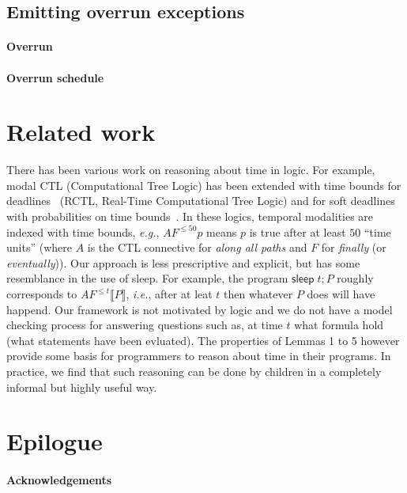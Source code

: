\documentclass[preprint]{sigplanconf}
\renewcommand{\leq}{\leqslant}
\theoremstyle{definition}
\newcommand{\sleep}{\mathsf{sleep}\;}
\newcommand{\sleepOp}{\textsf{sleep}}
\newcommand{\interp}[1]{\llbracket{#1}\rrbracket}
\newcommand{\ie}{\emph{i.e.}}
\newcommand{\eg}{\emph{e.g.}}
\begin{document}
\subsection{Emitting overrun exceptions}

\paragraph{Overrun}

\paragraph{Overrun schedule}


\section{Related work}

There has been various work on reasoning about time in logic. For
example, modal CTL (Computational Tree Logic) has been extended with
time bounds for deadlines~\cite{emerson1991quantitative} (RCTL,
Real-Time Computational Tree Logic) and for soft deadlines with
probabilities on time bounds~\cite{hansson1994logic}. In these logics,
temporal modalities are indexed with time bounds, \eg{}, $AF^{\leq 50}
p$ means $p$ is true after at least $50$ ``time units'' (where $A$ is
the CTL connective for \emph{along all paths} and $F$ for
\emph{finally} (or \emph{eventually})). Our approach is less
prescriptive and explicit, but has some resemblance in the use of
\sleepOp{}. For example, the program $\sleep t ; P$ roughly
corresponds to $AF^{\leq t} \interp{P}$, \ie{}, after at leat $t$ then
whatever $P$ does will have happend. Our framework is not motivated by
logic and we do not have a model checking process for answering
questions such as, at time $t$ what formula hold (what statements have
been evluated).  The properties of Lemmas 1 to 5 however provide some
basis for programmers to reason about time in their programs. In
practice, we find that such reasoning can be done by children in a
completely informal but highly useful way.



\section{Epilogue}


\paragraph{Acknowledgements}
\end{document}
